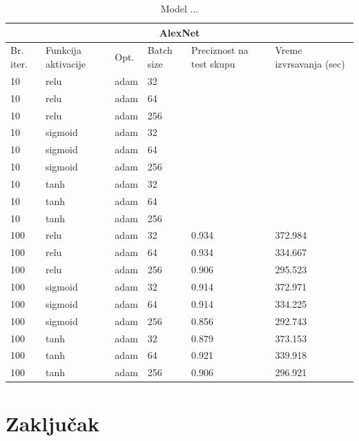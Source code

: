 \documentclass[a4paper]{article}
\begin{document}
\begin{table}[h!]
\begin{center}
\caption{Model ...}
\begin{tabular}{ |p{0.5cm}|p{1.5cm}||p{2cm}|p{1cm}|p{1.5cm}|p{1cm}| }
 \hline
 \multicolumn{6}{|c|}{AlexNet} \\
 \hline
 Br. iter. & Funkcija aktivacije & Opt. & Batch size & Preciznost na test skupu & Vreme izvrsavanja (sec)\\
 \hline
 10  & relu    & adam & 32  &   &   \\
 10  & relu    & adam & 64  &   &   \\
 10  & relu    & adam & 256 &   &   \\
 10  & sigmoid & adam & 32  &   &   \\
 10  & sigmoid & adam & 64  &   &   \\
 10  & sigmoid & adam & 256 &   &   \\
 10  & tanh    & adam & 32  &   &   \\
 10  & tanh    & adam & 64  &   &   \\
 10  & tanh    & adam & 256 &   &   \\
 
 100 & relu    & adam  & 32  & 0.934  & 372.984  \\
 100 & relu    & adam  & 64  & 0.934  & 334.667  \\
 100 & relu    & adam  & 256 & 0.906 & 295.523  \\ 
 100 & sigmoid & adam  & 32  & 0.914 & 372.971  \\
 100 & sigmoid & adam  & 64  & 0.914 & 334.225  \\
 100 & sigmoid & adam  & 256 & 0.856 & 292.743  \\
 100 & tanh    & adam  & 32  & 0.879  & 373.153  \\
 100 & tanh    & adam  & 64  & 0.921  &  339.918 \\
 100 & tanh    & adam  & 256 & 0.906  & 296.921  \\

 \hline
\end{tabular}
\end{center}
\end{table}




\newpage

\section{Zaključak}
\label{sec:zakljucak}

\newpage

\appendix
 


\newpage

\appendix
\end{document}

